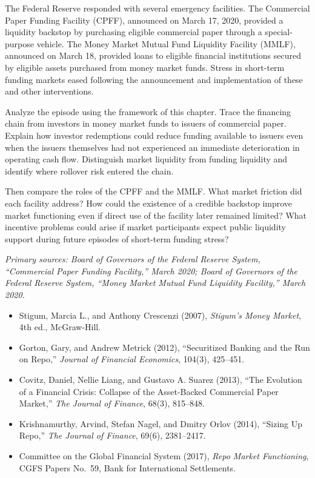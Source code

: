 The Federal Reserve responded with several emergency facilities. The Commercial Paper Funding Facility (CPFF), announced on March 17, 2020, provided a liquidity backstop by purchasing eligible commercial paper through a special-purpose vehicle. The Money Market Mutual Fund Liquidity Facility (MMLF), announced on March 18, provided loans to eligible financial institutions secured by eligible assets purchased from money market funds. Stress in short-term funding markets eased following the announcement and implementation of these and other interventions.

Analyze the episode using the framework of this chapter. Trace the financing chain from investors in money market funds to issuers of commercial paper. Explain how investor redemptions could reduce funding available to issuers even when the issuers themselves had not experienced an immediate deterioration in operating cash flow. Distinguish market liquidity from funding liquidity and identify where rollover risk entered the chain.

Then compare the roles of the CPFF and the MMLF. What market friction did each facility address? How could the existence of a credible backstop improve market functioning even if direct use of the facility later remained limited? What incentive problems could arise if market participants expect public liquidity support during future episodes of short-term funding stress?

\emph{Primary sources: Board of Governors of the Federal Reserve System, ``Commercial Paper Funding Facility,'' March 2020; Board of Governors of the Federal Reserve System, ``Money Market Mutual Fund Liquidity Facility,'' March 2020.}



\begin{itemize}

\item Stigum, Marcia L., and Anthony Crescenzi (2007),
\emph{Stigum's Money Market}, 4th ed., McGraw-Hill.

\item Gorton, Gary, and Andrew Metrick (2012),
``Securitized Banking and the Run on Repo,''
\emph{Journal of Financial Economics}, 104(3), 425--451.

\item Covitz, Daniel, Nellie Liang, and Gustavo A. Suarez (2013),
``The Evolution of a Financial Crisis: Collapse of the Asset-Backed Commercial Paper Market,''
\emph{The Journal of Finance}, 68(3), 815--848.

\item Krishnamurthy, Arvind, Stefan Nagel, and Dmitry Orlov (2014),
``Sizing Up Repo,''
\emph{The Journal of Finance}, 69(6), 2381--2417.

\item Committee on the Global Financial System (2017),
\emph{Repo Market Functioning},
CGFS Papers No.~59, Bank for International Settlements.

\end{itemize}

